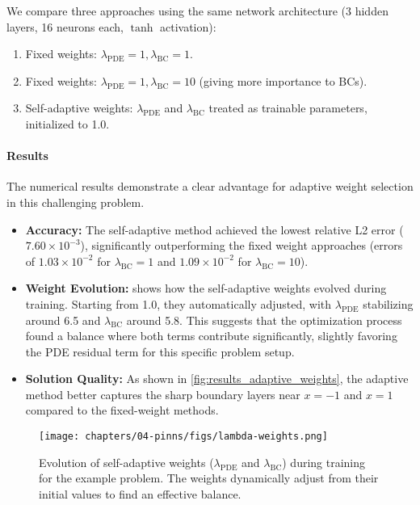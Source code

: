 We compare three approaches using the same network architecture (3 hidden layers, 16 neurons each, $\tanh$ activation):
\begin{enumerate}
    \item Fixed weights: $\lambda_{\text{PDE}} = 1, \lambda_{\text{BC}} = 1$.
    \item Fixed weights: $\lambda_{\text{PDE}} = 1, \lambda_{\text{BC}} = 10$ (giving more importance to BCs).
    \item Self-adaptive weights: $\lambda_{\text{PDE}}$ and $\lambda_{\text{BC}}$ treated as trainable parameters, initialized to 1.0.
\end{enumerate}


\paragraph{Results}
The numerical results demonstrate a clear advantage for adaptive weight selection in this challenging problem.
\begin{itemize}
    \item \textbf{Accuracy:} The self-adaptive method achieved the lowest relative L2 error ($7.60\times10^{-3}$), significantly outperforming the fixed weight approaches (errors of $1.03\times10^{-2}$ for $\lambda_{\text{BC}}=1$ and $1.09\times10^{-2}$ for $\lambda_{\text{BC}}=10$).
    \item \textbf{Weight Evolution:}  shows how the self-adaptive weights evolved during training. Starting from 1.0, they automatically adjusted, with $\lambda_{\text{PDE}}$ stabilizing around 6.5 and $\lambda_{\text{BC}}$ around 5.8. This suggests that the optimization process found a balance where both terms contribute significantly, slightly favoring the PDE residual term for this specific problem setup.
    \item \textbf{Solution Quality:} As shown in \cref{fig:results_adaptive_weights}, the adaptive method better captures the sharp boundary layers near $x=-1$ and $x=1$ compared to the fixed-weight methods.
\end{itemize}

\begin{figure}[htbp]
    \centering
    \texttt{[image: chapters/04-pinns/figs/lambda-weights.png]} %
    \caption{Evolution of self-adaptive weights ($\lambda_{\text{PDE}}$ and $\lambda_{\text{BC}}$) during training for the example problem. The weights dynamically adjust from their initial values to find an effective balance.}
    \label{fig:adaptive_weight_evolution} %
\end{figure}

